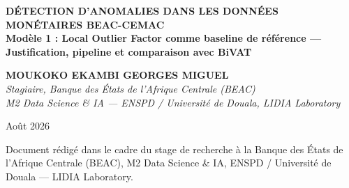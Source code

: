 \documentclass[12pt,a4paper]{article}
\begin{document}
\begin{titlepage}
\centering
\vspace*{2cm}

{\LARGE\bfseries
DÉTECTION D'ANOMALIES DANS LES DONNÉES MONÉTAIRES BEAC-CEMAC\\[0.4em]
\large\normalfont
Modèle 1 : Local Outlier Factor comme baseline de référence ---
Justification, pipeline et comparaison avec BiVAT\\[0.4em]
}

\vspace{2cm}

{\large\bfseries MOUKOKO EKAMBI GEORGES MIGUEL}\\[0.5em]
{\normalsize\itshape
Stagiaire, Banque des États de l'Afrique Centrale (BEAC)\\
M2 Data Science \& IA --- ENSPD / Université de Douala, LIDIA Laboratory
}

\vspace{2cm}

{\normalsize Août 2026}

\vfill

{\small
Document rédigé dans le cadre du stage de recherche à la Banque des États
de l'Afrique Centrale (BEAC), M2 Data Science \& IA,
ENSPD / Université de Douala --- LIDIA Laboratory.
}
\end{titlepage}

\begin{abstract}
Ce document présente la méthodologie complète du Modèle~1 d'une étude
comparative à deux niveaux portant sur la détection non supervisée de
variations atypiques dans les données monétaires des Autres Sociétés de
Dépôts (2SR) de la zone CEMAC. Le Modèle~1 est le Local Outlier Factor
(LOF), retenu comme baseline de référence parmi huit méthodes concurrentes
sur la base de critères empiriques documentés. Trois contributions structurent
ce document. Premièrement, une justification empirique du choix du LOF parmi
les méthodes de détection d'anomalies classiques, appuyée sur des benchmarks
publiés et cinq publications institutionnelles BIS/BCE/Banca d'Italia.
Deuxièmement, la documentation des cinq lacunes structurelles du LOF ---
ignorance des dépendances temporelles, dégénérescence en haute dimension,
absence de quantification d'incertitude, inexplicabilité par indicateur, et
instabilité des scores --- qui motivent le passage au Modèle~2 (BiVAT).
Troisièmement, un protocole de comparaison entre les deux modèles sans labels
ground truth, fondé sur des métriques d'évaluation non supervisée adaptées au
contexte de surveillance macroprudentielle BEAC-CEMAC.

\bigskip
\noindent\textbf{Mots-clés :} détection d'anomalies non supervisée, Local
Outlier Factor, densité locale, séries temporelles financières, BEAC, CEMAC,
pipeline de prétraitement, baseline comparative, BiVAT.
\end{abstract}
\end{document}
